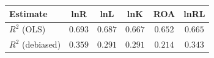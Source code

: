 \begin{tabular}{l*{5}{c}}
\hline\hline
 Estimate & lnR & lnL & lnK & ROA & lnRL \\
\hline
\addlinespace $ R^2$ (OLS) & $0.693$ & $0.687$ & $0.667$ & $0.652$ & $0.665$ \\
$ R^2$ (debiased) & $0.359$ & $0.291$ & $0.291$ & $0.214$ & $0.343$ \\
\hline\hline
\end{tabular}
